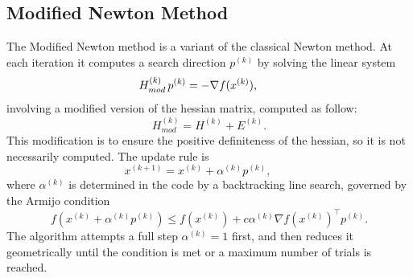 \documentclass[a4paper,12pt]{article}
\begin{document}
	\newpage
	\subsection{Modified Newton Method}
	
	The Modified Newton method is a variant of the classical Newton method. At each iteration it computes a search direction $p^{(k)}$ by solving the linear system
	\[
	H_{mod}^{(k)} \thinspace p^{(k)} = -\nabla f(x^{(k)}), \qquad 
	\]
	involving a modified version of the hessian matrix, computed as follow: 
	\[
	H_{mod}^{(k)} = H^{(k)} + E^{(k)} .
	\]
	This modification is to ensure the positive definiteness of the hessian, so it is not necessarily computed. The update rule is
	\[
	x^{(k+1)} = x^{(k)} + \alpha^{(k)} p^{(k)}, \qquad 
	\]
	where \( \alpha^{(k)} \) is determined in the code by a backtracking line search, governed by the Armijo condition
	\[
	f(x^{(k)} + \alpha^{(k)} p^{(k)}) \leq f(x^{(k)}) + c \alpha^{(k)} \nabla f(x^{(k)})^\top p^{(k)}.
	\]
	The algorithm attempts a full step \( \alpha^{(k)} = 1 \) first, and then reduces it geometrically until the condition is met or a maximum number of trials is reached. \\
	
\end{document}
